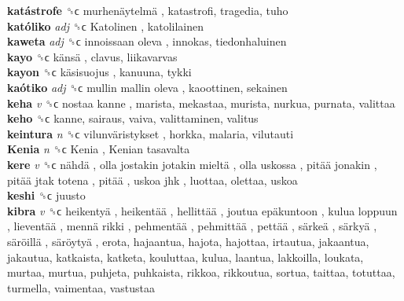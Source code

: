 \textbf{katástrofe} ␝ϲ   murhenäytelmä , katastrofi, tragedia, tuho  \\
\textbf{katóliko} \emph{adj}  ␝ϲ   Katolinen , katolilainen  \\
\textbf{kaweta} \emph{adj}  ␝ϲ   innoissaan oleva , innokas, tiedonhaluinen  \\
\textbf{kayo} ␝ϲ   känsä , clavus, liikavarvas  \\
\textbf{kayon} ␝ϲ   käsisuojus , kanuuna, tykki  \\
\textbf{kaótiko} \emph{adj}  ␝ϲ   mullin mallin oleva , kaoottinen, sekainen  \\
\textbf{keha} \emph{v}  ␝ϲ   nostaa kanne , marista, mekastaa, murista, nurkua, purnata, valittaa  \\
\textbf{keho} ␝ϲ  kanne, sairaus, vaiva, valittaminen, valitus  \\
\textbf{keintura} \emph{n}  ␝ϲ   vilunväristykset , horkka, malaria, vilutauti  \\
\textbf{Kenia} \emph{n}  ␝ϲ   Kenia ,  Kenian tasavalta   \\
\textbf{kere} \emph{v}  ␝ϲ   nähdä ,  olla jostakin jotakin mieltä ,  olla uskossa ,  pitää jonakin ,  pitää jtak totena ,  pitää ,  uskoa jhk , luottaa, olettaa, uskoa  \\
\textbf{keshi} ␝ϲ  juusto  \\
\textbf{kibra} \emph{v}  ␝ϲ   heikentyä ,  heikentää ,  hellittää ,  joutua epäkuntoon ,  kulua loppuun ,  lieventää ,  mennä rikki ,  pehmentää ,  pehmittää ,  pettää ,  särkeä ,  särkyä ,  säröillä ,  säröytyä , erota, hajaantua, hajota, hajottaa, irtautua, jakaantua, jakautua, katkaista, katketa, kouluttaa, kulua, laantua, lakkoilla, loukata, murtaa, murtua, puhjeta, puhkaista, rikkoa, rikkoutua, sortua, taittaa, totuttaa, turmella, vaimentaa, vastustaa  \\
